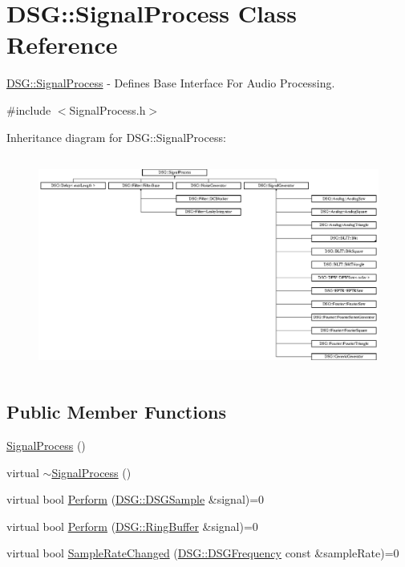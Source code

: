 \hypertarget{class_d_s_g_1_1_signal_process}{\section{D\+S\+G\+:\+:Signal\+Process Class Reference}
\label{class_d_s_g_1_1_signal_process}
}


\hyperlink{class_d_s_g_1_1_signal_process}{D\+S\+G\+::\+Signal\+Process} -\/ Defines Base Interface For Audio Processing.  




{\ttfamily \#include $<$Signal\+Process.\+h$>$}

Inheritance diagram for D\+S\+G\+:\+:Signal\+Process\+:\begin{figure}[H]
\begin{center}
\leavevmode
\includegraphics[height=7.148936cm]{class_d_s_g_1_1_signal_process}
\end{center}
\end{figure}
\subsection*{Public Member Functions}
\begin{DoxyCompactItemize}
\item 
\hyperlink{class_d_s_g_1_1_signal_process_a3fd4347483bcf3cc0a3d7bf98ff56218}{Signal\+Process} ()
\item 
virtual \hyperlink{class_d_s_g_1_1_signal_process_ad9b6a758241a092ddc38e13effc9553f}{$\sim$\+Signal\+Process} ()
\item 
virtual bool \hyperlink{class_d_s_g_1_1_signal_process_af73d246c460915db7a9be7e3ef36844d}{Perform} (\hyperlink{namespace_d_s_g_ac39a94cd27ebcd9c1e7502d0c624894a}{D\+S\+G\+::\+D\+S\+G\+Sample} \&signal)=0
\item 
virtual bool \hyperlink{class_d_s_g_1_1_signal_process_a2c8ff3487d9c43f9eace1d9192d4a37e}{Perform} (\hyperlink{class_d_s_g_1_1_ring_buffer}{D\+S\+G\+::\+Ring\+Buffer} \&signal)=0
\item 
virtual bool \hyperlink{class_d_s_g_1_1_signal_process_adf3ad4aff1486a1566120cc63e402fcf}{Sample\+Rate\+Changed} (\hyperlink{namespace_d_s_g_a4315a061386fa1014fda09b15d3a6973}{D\+S\+G\+::\+D\+S\+G\+Frequency} const \&sample\+Rate)=0
\end{DoxyCompactItemize}


